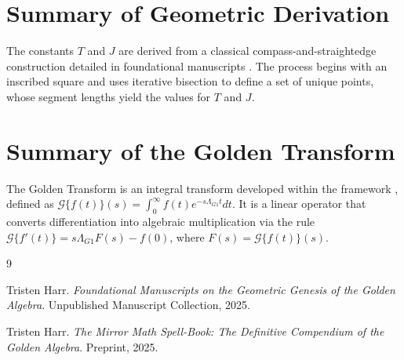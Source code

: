 \documentclass{amsart}
\theoremstyle{plain}
\theoremstyle{definition}
\theoremstyle{remark}
\begin{document}
\appendix
\section{Summary of Geometric Derivation}
The constants $T$ and $J$ are derived from a classical compass-and-straightedge construction detailed in foundational manuscripts \cite{HarrManuscripts}. The process begins with an inscribed square and uses iterative bisection to define a set of unique points, whose segment lengths yield the values for $T$ and $J$.

\section{Summary of the Golden Transform}
The Golden Transform is an integral transform developed within the framework \cite{HarrCompendium}, defined as $\mathcal{G}\{f(t)\}(s) = \int_0^\infty f(t) e^{-s\Lambda_{G1} t} dt$. It is a linear operator that converts differentiation into algebraic multiplication via the rule $\mathcal{G}\{f'(t)\} = s\Lambda_{G1} F(s) - f(0)$, where $F(s)=\mathcal{G}\{f(t)\}(s)$.

\begin{thebibliography}{9}

Tristen Harr.
\newblock \textit{Foundational Manuscripts on the Geometric Genesis of the Golden Algebra}.
\newblock Unpublished Manuscript Collection, 2025.

Tristen Harr.
\newblock \textit{The Mirror Math Spell-Book: The Definitive Compendium of the Golden Algebra}.
\newblock Preprint, 2025.

\end{thebibliography}
\end{document}
